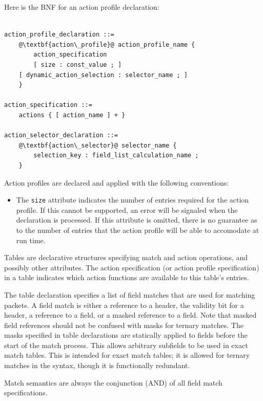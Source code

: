 \documentclass[12pt]{article}
\begin{document}
Here is the BNF for an action profile declaration:

\begin{lstlisting}[frame=single,backgroundcolor=\color{bnfgreen},escapechar=\@]

action_profile_declaration ::=
    @\textbf{action\_profile}@ action_profile_name {
        action_specification
        [ size : const_value ; ]
	[ dynamic_action_selection : selector_name ; ]
    }

action_specification ::= 
    actions { [ action_name ] + }

action_selector_declaration ::=
    @\textbf{action\_selector}@ selector_name {
        selection_key : field_list_calculation_name ;
    }

\end{lstlisting}

Action profiles are declared and applied with the following conventions:

\begin{itemize}
\item
The \texttt{size} attribute indicates the number of entries required for the
action profile. If this cannot be supported, an error will be signaled when the
declaration is processed. If this attribute is omitted, there is no guarantee as
to the number of entries that the action profile will be able to accomodate at
run time.
\end{itemize}



Tables are declarative structures specifying match and action operations, and
possibly other attributes. The action specification (or action profile
specification) in a table indicates which action functions are available to this
table's entries.

The table declaration specifies a list of field matches that are used
for matching packets. A field match is either a reference to a header,
the validity bit for a header, a reference to a field, or a masked
reference to a field. Note that masked field references should not be
confused with masks for ternary matches. The masks specified in table
declarations are statically applied to fields before the start of the
match process. This allows arbitrary subfields to be used in exact
match tables. This is intended for exact match tables; it is allowed
for ternary matches in the syntax, though it is functionally
redundant.

Match semantics are always the conjunction (AND) of all field match
specifications.
\end{document}
